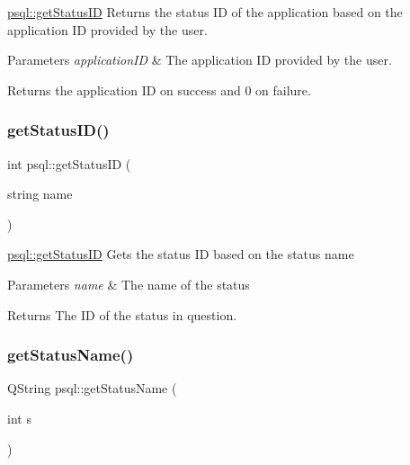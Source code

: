 \mbox{\hyperlink{classpsql_a9c02c92c09cb60c35d24375673b7df06}{psql\+::get\+Status\+ID}} Returns the status ID of the application based on the application ID provided by the user. 


\begin{DoxyParams}{Parameters}
{\em application\+ID} & The application ID provided by the user. \\
\hline
\end{DoxyParams}
\begin{DoxyReturn}{Returns}
the application ID on success and 0 on failure. 
\end{DoxyReturn}
\mbox{\label{classpsql_a9d13aebcb6d151719769207238865e75}} 
\subsubsection{\texorpdfstring{getStatusID()}{getStatusID()}\hspace{0.1cm}{\footnotesize\ttfamily [2/2]}}
{\footnotesize\ttfamily int psql\+::get\+Status\+ID (\begin{DoxyParamCaption}\item[{string}]{name }\end{DoxyParamCaption})}



\mbox{\hyperlink{classpsql_a9c02c92c09cb60c35d24375673b7df06}{psql\+::get\+Status\+ID}} Gets the status ID based on the status name 


\begin{DoxyParams}{Parameters}
{\em name} & The name of the status \\
\hline
\end{DoxyParams}
\begin{DoxyReturn}{Returns}
The ID of the status in question. 
\end{DoxyReturn}
\mbox{\label{classpsql_a5c2a64419a68a258071fd1f9a37c7c09}} 
\subsubsection{\texorpdfstring{getStatusName()}{getStatusName()}}
{\footnotesize\ttfamily Q\+String psql\+::get\+Status\+Name (\begin{DoxyParamCaption}\item[{int}]{s }\end{DoxyParamCaption})}




